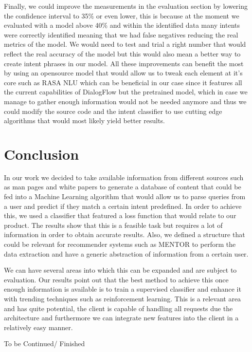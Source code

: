 Finally, we could improve the measurements in the evaluation section by lowering the confidence interval to 35\% or even lower, this is because at the moment we evaluated with a model above 40\% and within the identified data many intents were correctly identified meaning that we had false negatives reducing the real metrics of the model. We would need to test and trial a right number that would reflect the real accuracy of the model but this would also mean a better way to create intent phrases in our model. All these improvements can benefit the most by using an opensource model that would allow us to tweak each element at it's core such as RASA NLU which can be beneficial in our case since it features all the current capabilities of DialogFlow but the pretrained model, which in case we manage to gather enough information would not be needed anymore and thus we could modify the source code and the intent classifier to use cutting edge algorithms that would most likely yield better results.

\section{Conclusion}

In our work we decided to take available information from different sources such as man pages and white papers to generate a database of content that could be fed into a Machine Learning algorithm that would allow us to parse queries from a user and predict if they match a certain intent predefined. In order to achieve this, we used a classifier that featured a loss function that would relate to our product. The results show that this is a feasible task but requires a lot of information in order to obtain accurate results. Also, we defined a structure that could be relevant for recommender systems such as MENTOR to perform the data extraction and have a generic abstraction of information from a certain user.

We can have several areas into which this can be expanded and are subject to evaluation. Our results point out that the best method to achieve this once enough information is available is to train a supervised classifier and enhance it with trending techniques such as reinforcement learning. This is a relevant area and has quite potential, the client is capable of handling all requests due the architecture and furthermore we can integrate new features into the client in a relatively easy manner.

To be Continued/ Finished
